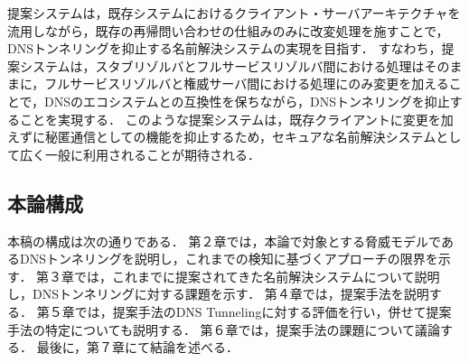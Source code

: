提案システムは，既存システムにおけるクライアント・サーバアーキテクチャを流用しながら，既存の再帰問い合わせの仕組みのみに改変処理を施すことで，DNSトンネリングを抑止する名前解決システムの実現を目指す．
すなわち，提案システムは，スタブリゾルバとフルサービスリゾルバ間における処理はそのままに，フルサービスリゾルバと権威サーバ間における処理にのみ変更を加えることで，DNSのエコシステムとの互換性を保ちながら，DNSトンネリングを抑止することを実現する．
このような提案システムは，既存クライアントに変更を加えずに秘匿通信としての機能を抑止するため，セキュアな名前解決システムとして広く一般に利用されることが期待される．





\subsection{本論構成}
本稿の構成は次の通りである．
第２章では，本論で対象とする脅威モデルであるDNSトンネリングを説明し，これまでの検知に基づくアプローチの限界を示す．
第３章では，これまでに提案されてきた名前解決システムについて説明し，DNSトンネリングに対する課題を示す．
第４章では，提案手法を説明する．
第５章では，提案手法のDNS Tunnelingに対する評価を行い，併せて提案手法の特定についても説明する．
第６章では，提案手法の課題について議論する．
最後に，第７章にて結論を述べる．
